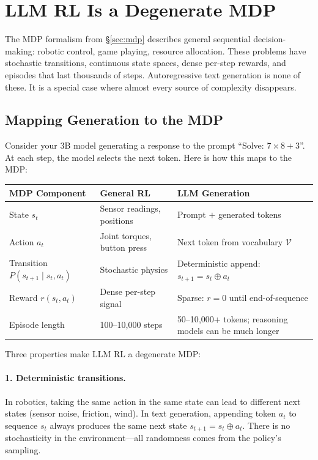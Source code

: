 \section{LLM RL Is a Degenerate MDP}
\label{sec:llm-mdp}

The MDP formalism from \S\ref{sec:mdp} describes general sequential decision-making: robotic control, game playing, resource allocation. These problems have stochastic transitions, continuous state spaces, dense per-step rewards, and episodes that last thousands of steps. Autoregressive text generation is none of these. It is a special case where almost every source of complexity disappears.

\subsection{Mapping Generation to the MDP}

Consider your 3B model generating a response to the prompt ``Solve: $7 \times 8 + 3$''. At each step, the model selects the next token. Here is how this maps to the MDP:

\begin{center}
\small
\begin{tabularx}{\textwidth}{@{}lXX@{}}
\toprule
\textbf{MDP Component} & \textbf{General RL} & \textbf{LLM Generation} \\
\midrule
State $s_t$ & Sensor readings, positions & Prompt $+$ generated tokens \\
Action $a_t$ & Joint torques, button press & Next token from vocabulary $\mathcal{V}$ \\
Transition $P(s_{t+1} \mid s_t, a_t)$ & Stochastic physics & Deterministic append: $s_{t+1} = s_t \oplus a_t$ \\
Reward $r(s_t, a_t)$ & Dense per-step signal & Sparse: $r = 0$ until end-of-sequence \\
Episode length & 100--10{,}000 steps & 50--10{,}000+ tokens; reasoning models can be much longer \\
\bottomrule
\end{tabularx}
\normalsize
\end{center}

Three properties make LLM RL a degenerate MDP:

\paragraph{1. Deterministic transitions.} In robotics, taking the same action in the same state can lead to different next states (sensor noise, friction, wind). In text generation, appending token $a_t$ to sequence $s_t$ always produces the same next state $s_{t+1} = s_t \oplus a_t$. There is no stochasticity in the environment---all randomness comes from the policy's sampling.


